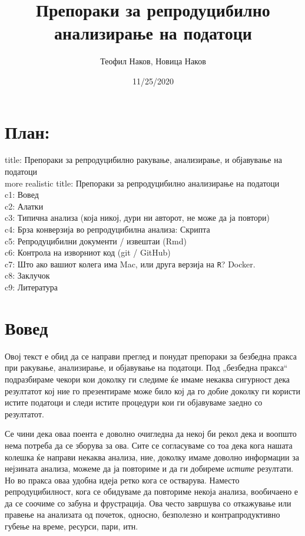 \documentclass[
]{book}
\title{Препораки за репродуцибилно анализирање на податоци}
\author{Теофил Наков, Новица Наков}
\date{11/25/2020}
\begin{document}
\maketitle

{
\setcounter{tocdepth}{1}
\tableofcontents
}
\hypertarget{ux43fux43bux430ux43d}{%
\chapter{План:}\label{ux43fux43bux430ux43d}}

title: Препораки за репродуцибилно ракување, анализирање, и објавување на податоци\\
more realistic title: Препораки за репродуцибилно анализирање на податоци\\
c1: Вовед\\
c2: Алатки\\
c3: Типична анализа (која никој, дури ни авторот, не може да ја повтори)\\
c4: Брза конверзија во репродуцибилна анализа: Скрипта\\
c5: Репродуцибилни документи / извештаи (Rmd)\\
c6: Контрола на изворниот код (git / GitHub)\\
c7: Што ако вашиот колега има Mac, или друга верзија на \texttt{R}? Docker.\\
c8: Заклучок\\
c9: Литература

\hypertarget{intro}{%
\chapter{Вовед}\label{intro}}

Овој текст е обид да се направи преглед и понудат препораки за безбедна пракса при ракување, анализирање, и објавување на податоци. Под „безбедна пракса`` подразбираме чекори кои доколку ги следиме ќе имаме некаква сигурност дека резултатот кој ние го презентираме може било кој да го добие доколку ги користи истите податоци и следи истите процедури кои ги објавуваме заедно со резултатот.

Се чини дека оваа поента е доволно очигледна да некој би рекол дека и воопшто нема потреба да се зборува за ова. Сите се согласуваме со тоа дека кога нашата колешка ќе направи некаква анализа, ние, доколку имаме доволно информации за нејзината анализа, можеме да ја повториме и да ги добиреме \emph{истите} резултати. Но во пракса оваа удобна идеја ретко кога се остварува. Наместо репродуцибилност, кога се обидуваме да повториме некоја анализа, вообичаено е да се соочиме со забуна и фрустрација. Ова често завршува со откажување или правење на анализата од почеток, односно, безполезно и контрапродуктивно губење на време, ресурси, пари, итн.
\end{document}
